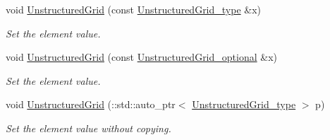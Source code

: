 \begin{DoxyCompactItemize}
void \hyperlink{classVTKFile__t_a2c2b1b2ff487c7e61bcd2875db8747be}{Unstructured\+Grid} (const \hyperlink{classVTKFile__t_a34ea02f6804e701657f11a8dc3851951}{Unstructured\+Grid\+\_\+type} \&x)
\begin{DoxyCompactList}\small\item\em Set the element value. \end{DoxyCompactList}\item 
void \hyperlink{classVTKFile__t_ae33d9781bddb747f9255570b1af2dfeb}{Unstructured\+Grid} (const \hyperlink{classVTKFile__t_ada5bb5a706e03ef1ab2ed1513ea83833}{Unstructured\+Grid\+\_\+optional} \&x)
\begin{DoxyCompactList}\small\item\em Set the element value. \end{DoxyCompactList}\item 
void \hyperlink{classVTKFile__t_af19a966f55acb5f03299af922bd9dd75}{Unstructured\+Grid} (\+::std\+::auto\+\_\+ptr$<$ \hyperlink{classVTKFile__t_a34ea02f6804e701657f11a8dc3851951}{Unstructured\+Grid\+\_\+type} $>$ p)
\begin{DoxyCompactList}\small\item\em Set the element value without copying. \end{DoxyCompactList}\end{DoxyCompactItemize}
